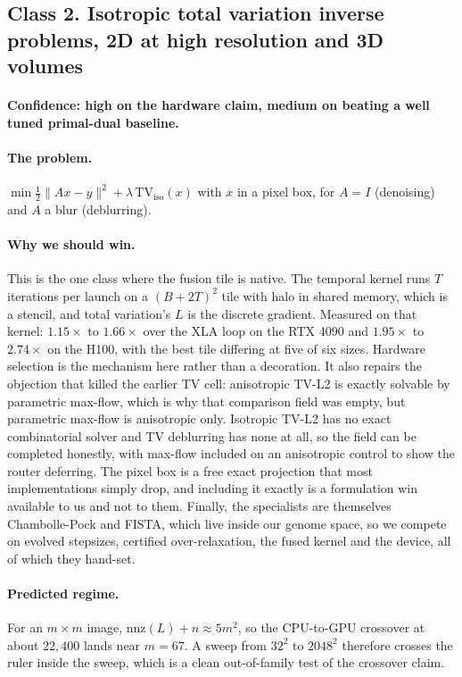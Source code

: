 \documentclass[11pt]{article}
\begin{document}
\subsection{Class 2. Isotropic total variation inverse problems, 2D at high
resolution and 3D volumes}

\paragraph{Confidence: high on the hardware claim, medium on beating a well
tuned primal-dual baseline.}

\paragraph{The problem.}
$\min \tfrac12\|Ax-y\|^2 + \lambda\,\mathrm{TV}_{\mathrm{iso}}(x)$ with $x$ in a
pixel box, for $A = I$ (denoising) and $A$ a blur (deblurring).

\paragraph{Why we should win.} This is the one class where the fusion tile is
native. The temporal kernel runs $T$ iterations per launch on a $(B+2T)^2$ tile
with halo in shared memory, which is a stencil, and total variation's $L$ is the
discrete gradient. Measured on that kernel: $1.15\times$ to $1.66\times$ over
the XLA loop on the RTX 4090 and $1.95\times$ to $2.74\times$ on the H100, with
the best tile differing at five of six sizes. Hardware selection is the
mechanism here rather than a decoration. It also repairs the objection that
killed the earlier TV cell: anisotropic TV-L2 is exactly solvable by parametric
max-flow, which is why that comparison field was empty, but parametric max-flow
is anisotropic only. Isotropic TV-L2 has no exact combinatorial solver and TV
deblurring has none at all, so the field can be completed honestly, with
max-flow included on an anisotropic control to show the router deferring. The
pixel box is a free exact projection that most implementations simply drop, and
including it exactly is a formulation win available to us and not to them.
Finally, the specialists are themselves Chambolle-Pock and FISTA, which live
inside our genome space, so we compete on evolved stepsizes, certified
over-relaxation, the fused kernel and the device, all of which they hand-set.

\paragraph{Predicted regime.} For an $m \times m$ image,
$\mathrm{nnz}(L) + n \approx 5m^2$, so the CPU-to-GPU crossover at about
$22{,}400$ lands near $m = 67$. A sweep from $32^2$ to $2048^2$ therefore
crosses the ruler inside the sweep, which is a clean out-of-family test of the
crossover claim.
\end{document}
